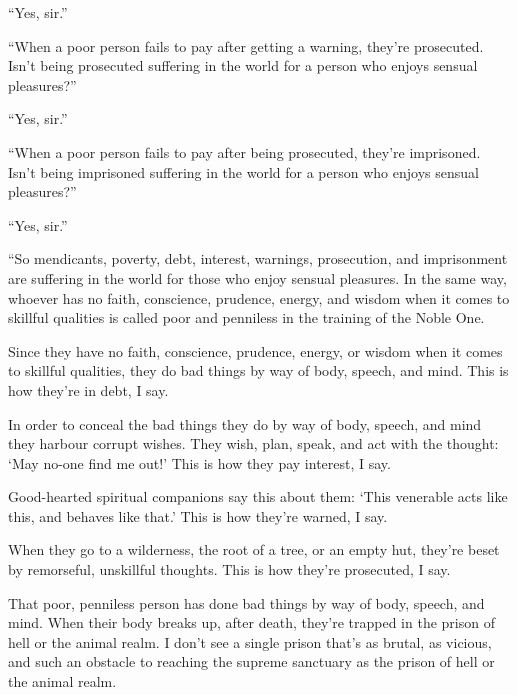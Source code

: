\documentclass[12pt,openany]{book}%
\begin{document}
“Yes, sir.” 

“When a poor person fails to pay after getting a warning, they’re prosecuted. Isn’t being prosecuted suffering in the world for a person who enjoys sensual pleasures?” 

“Yes, sir.” 

“When a poor person fails to pay after being prosecuted, they’re imprisoned. Isn’t being imprisoned suffering in the world for a person who enjoys sensual pleasures?” 

“Yes, sir.” 

“So mendicants, poverty, debt, interest, warnings, prosecution, and imprisonment are suffering in the world for those who enjoy sensual pleasures. In the same way, whoever has no faith, conscience, prudence, energy, and wisdom when it comes to skillful qualities is called poor and penniless in the training of the Noble One. 

Since they have no faith, conscience, prudence, energy, or wisdom when it comes to skillful qualities, they do bad things by way of body, speech, and mind. This is how they’re in debt, I say. 

In order to conceal the bad things they do by way of body, speech, and mind they harbour corrupt wishes. They wish, plan, speak, and act with the thought: ‘May no-one find me out!’ This is how they pay interest, I say. 

Good-hearted spiritual companions say this about them: ‘This venerable acts like this, and behaves like that.’ This is how they’re warned, I say. 

When they go to a wilderness, the root of a tree, or an empty hut, they’re beset by remorseful, unskillful thoughts. This is how they’re prosecuted, I say. 

That poor, penniless person has done bad things by way of body, speech, and mind. When their body breaks up, after death, they’re trapped in the prison of hell or the animal realm. I don’t see a single prison that’s as brutal, as vicious, and such an obstacle to reaching the supreme sanctuary as the prison of hell or the animal realm. 
\end{document}
